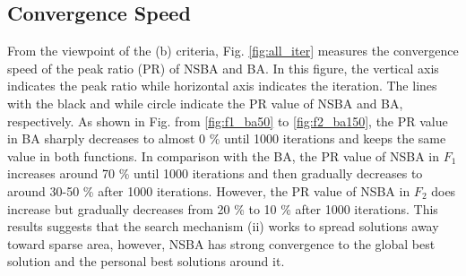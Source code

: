 \documentclass{ies2018}
\begin{document}
\subsection{Convergence Speed}
From the viewpoint of the (b) criteria, Fig. \ref{fig:all_iter} measures the convergence speed of the peak ratio (PR) of NSBA and BA. In this figure, the vertical axis indicates the peak ratio while horizontal axis indicates the iteration. The lines with the black and while circle indicate the PR value of NSBA and BA, respectively. As shown in Fig. from \ref{fig:f1_ba50} to \ref{fig:f2_ba150}, the PR value in BA sharply decreases to almost 0 \% until 1000 iterations and keeps the same value in both functions. In comparison with the BA, the PR value of NSBA in $F_1$ increases around 70 \% until 1000 iterations and then gradually decreases to around 30-50 \% after 1000 iterations. However, the PR value of NSBA in $F_2$ does increase but gradually decreases from 20 \% to 10 \% after 1000 iterations. This results suggests that the search mechanism (ii) works to spread solutions away toward sparse area, however, NSBA has strong convergence to the global best solution and the personal best solutions around it. 





\end{document}
